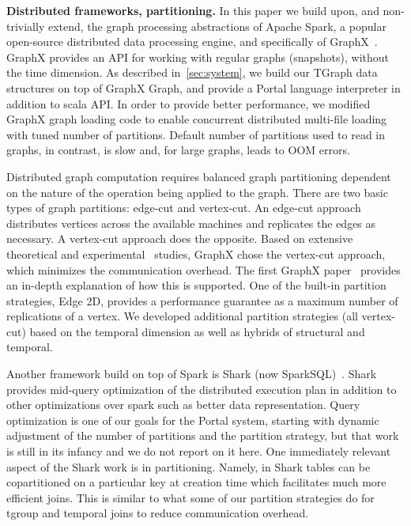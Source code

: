 {\bf Distributed frameworks, partitioning.}  In this paper we build
upon, and non-trivially extend, the graph processing abstractions of
Apache Spark, a popular open-source distributed data processing
engine, and specifically of
GraphX~\cite{DBLP:conf/osdi/GonzalezXDCFS14}.  GraphX provides an API
for working with regular graphs (snapshots), without the time
dimension.  As described in~\ref{sec:system}, we build our TGraph data
structures on top of GraphX Graph, and provide a Portal language
interpreter in addition to scala API.  In order to provide better
performance, we modified GraphX graph loading code to enable
concurrent distributed multi-file loading with tuned number of
partitions.  Default number of partitions used to read in graphs, in
contrast, is slow and, for large graphs, leads to OOM errors.

Distributed graph computation requires balanced graph partitioning
dependent on the nature of the operation being applied to the graph.
There are two basic types of graph partitions: edge-cut and
vertex-cut.  An edge-cut approach distributes vertices across the
available machines and replicates the edges as necessary.  A
vertex-cut approach does the opposite.  Based on extensive theoretical
and experimental~\cite{Gonzalez2012} studies, GraphX chose the
vertex-cut approach, which minimizes the communication overhead.  The
first GraphX paper~\cite{Xin2013} provides an in-depth explanation of
how this is supported.  One of the built-in partition strategies, Edge
2D, provides a performance guarantee as a maximum number of
replications of a vertex.  We developed additional partition
strategies (all vertex-cut) based on the temporal dimension as well as
hybrids of structural and temporal.

Another framework build on top of Spark is Shark (now
SparkSQL)~\cite{Xin2013}.  Shark provides mid-query optimization of
the distributed execution plan in addition to other optimizations over
spark such as better data representation.  Query optimization is one
of our goals for the Portal system, starting with dynamic adjustment
of the number of partitions and the partition strategy, but that work
is still in its infancy and we do not report on it here.  One
immediately relevant aspect of the Shark work is in partitioning.
Namely, in Shark tables can be copartitioned on a particular key at
creation time which facilitates much more efficient joins.  This is
similar to what some of our partition strategies do for tgroup and
temporal joins to reduce communication overhead.

